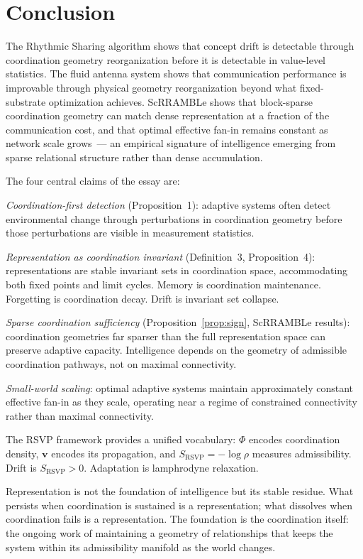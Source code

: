 \documentclass[11pt, a4paper]{article}
\theoremstyle{definition}
\theoremstyle{remark}
\begin{document}
\section{Conclusion}

The Rhythmic Sharing algorithm shows that concept drift is detectable through
coordination geometry reorganization before it is detectable in value-level
statistics. The fluid antenna system shows that communication performance
is improvable through physical geometry reorganization beyond what
fixed-substrate optimization achieves. ScRRAMBLe shows that block-sparse
coordination geometry can match dense representation at a fraction of the
communication cost, and that optimal effective fan-in remains constant as
network scale grows~--- an empirical signature of intelligence emerging from
sparse relational structure rather than dense accumulation.

The four central claims of the essay are:

\textit{Coordination-first detection} (Proposition~1): adaptive systems often
detect environmental change through perturbations in coordination geometry
before those perturbations are visible in measurement statistics.

\textit{Representation as coordination invariant} (Definition~3,
Proposition~4): representations are stable invariant sets in coordination
space, accommodating both fixed points and limit cycles. Memory is
coordination maintenance. Forgetting is coordination decay. Drift is
invariant set collapse.

\textit{Sparse coordination sufficiency} (Proposition~\ref{prop:sign},
ScRRAMBLe results): coordination geometries far sparser than the full
representation space can preserve adaptive capacity. Intelligence depends
on the geometry of admissible coordination pathways, not on maximal
connectivity.

\textit{Small-world scaling}: optimal adaptive systems maintain approximately
constant effective fan-in as they scale, operating near a regime of
constrained connectivity rather than maximal connectivity.

The RSVP framework provides a unified vocabulary: $\Phi$ encodes
coordination density, $\mathbf{v}$ encodes its propagation, and
$S_{\mathrm{RSVP}} = -\log\rho$ measures admissibility. Drift is
$S_{\mathrm{RSVP}} > 0$. Adaptation is lamphrodyne relaxation.

Representation is not the foundation of intelligence but its stable residue.
What persists when coordination is sustained is a representation; what
dissolves when coordination fails is a representation. The foundation is
the coordination itself: the ongoing work of maintaining a geometry of
relationships that keeps the system within its admissibility manifold as
the world changes.
\end{document}
